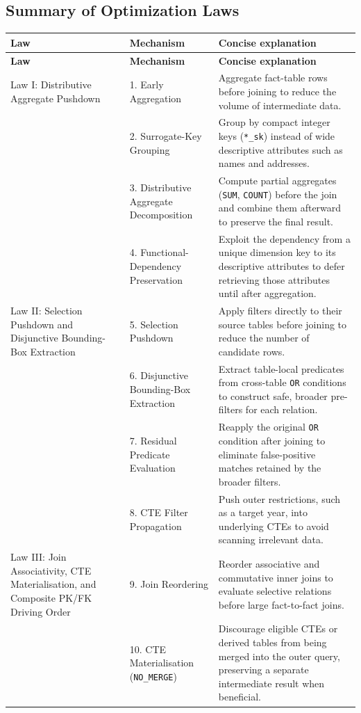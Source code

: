 \documentclass{ULBreport}
\begin{document}
\subsection{Summary of Optimization Laws}
\begingroup
\small
\begin{longtable}{@{}p{}p{}p{}@{}}
\toprule
\textbf{Law} & \textbf{Mechanism} & \textbf{Concise explanation} \\
\midrule
\endfirsthead
\toprule
\textbf{Law} & \textbf{Mechanism} & \textbf{Concise explanation} \\
\midrule
\endhead
\bottomrule
\endfoot
Law I: Distributive Aggregate Pushdown & 1. Early Aggregation & Aggregate fact-table rows before joining to reduce the volume of intermediate data. \\
 & 2. Surrogate-Key Grouping & Group by compact integer keys (\texttt{*\_sk}) instead of wide descriptive attributes such as names and addresses. \\
 & 3. Distributive Aggregate Decomposition & Compute partial aggregates (\texttt{SUM}, \texttt{COUNT}) before the join and combine them afterward to preserve the final result. \\
 & 4. Functional-Dependency Preservation & Exploit the dependency from a unique dimension key to its descriptive attributes to defer retrieving those attributes until after aggregation. \\
\addlinespace
Law II: Selection Pushdown and Disjunctive Bounding-Box Extraction & 5. Selection Pushdown & Apply filters directly to their source tables before joining to reduce the number of candidate rows. \\
 & 6. Disjunctive Bounding-Box Extraction & Extract table-local predicates from cross-table \texttt{OR} conditions to construct safe, broader pre-filters for each relation. \\
 & 7. Residual Predicate Evaluation & Reapply the original \texttt{OR} condition after joining to eliminate false-positive matches retained by the broader filters. \\
 & 8. CTE Filter Propagation & Push outer restrictions, such as a target year, into underlying CTEs to avoid scanning irrelevant data. \\
\addlinespace
Law III: Join Associativity, CTE Materialisation, and Composite PK/FK Driving Order & 9. Join Reordering & Reorder associative and commutative inner joins to evaluate selective relations before large fact-to-fact joins. \\
 & 10. CTE Materialisation (\texttt{NO\_MERGE}) & Discourage eligible CTEs or derived tables from being merged into the outer query, preserving a separate intermediate result when beneficial. \\

\end{longtable}
\end{document}

